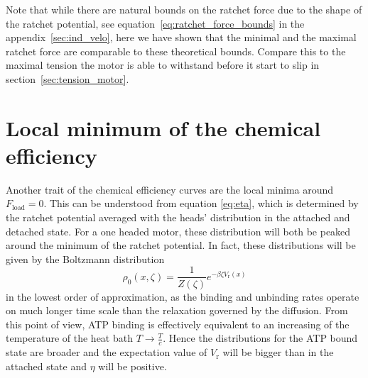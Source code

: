 \documentclass[aps,pre,twocolumn,showpacs,showkeys,superscriptaddress,floatfix]{revtex4-1}
\begin{document}
Note that while there are natural bounds on the ratchet force due to the shape of the ratchet potential, 
see equation~\eqref{eq:ratchet_force_bounds} in the appendix~\ref{sec:ind_velo}, 
here we have shown that the minimal and the maximal ratchet force are comparable to these theoretical bounds. 
Compare this to the maximal tension the motor is able to withstand before it start to slip in section~\ref{sec:tension_motor}. 


\section{Local minimum of the chemical efficiency}
\label{sec:local_minimum}
Another trait of the chemical efficiency curves are the local minima around $F_\text{load}=0$. 
This can be understood from equation \eqref{eq:eta}, which is determined by the ratchet potential averaged with the heads' distribution in the attached and detached state. 
For a one headed motor, these distribution will both be peaked around the minimum of the ratchet potential. 
In fact, these distributions will be given by the Boltzmann distribution
\begin{equation*}
\rho_0(x,\zeta) = \frac{1}{Z(\zeta)} e^{-\beta \zeta V_\text{r}(x)}
\end{equation*} 
in the lowest order of approximation, as the binding and unbinding rates operate on much longer time scale than the relaxation governed by the diffusion. 
From this point of view, ATP binding is effectively equivalent to an increasing of the temperature of the heat bath $T\rightarrow\frac{T}{c}$. 
Hence the distributions for the ATP bound state are broader and the expectation value of $V_\text{r}$ will be bigger than in the attached state and $\eta$ will be positive. 
\end{document}
